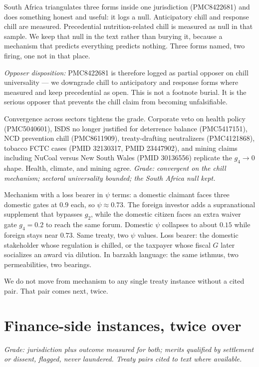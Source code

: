 South Africa triangulates three forms inside one jurisdiction (PMC8422681) and does something honest and useful: it logs a null. Anticipatory chill and response chill are measured. Precedential nutrition-related chill is measured as null in that sample. We keep that null in the text rather than burying it, because a mechanism that predicts everything predicts nothing. Three forms named, two firing, one not in that place.

\textit{Opposer disposition:} PMC8422681 is therefore logged as partial opposer on chill universality --- we downgrade chill to anticipatory and response forms where measured and keep precedential as open. This is not a footnote burial. It is the serious opposer that prevents the chill claim from becoming unfalsifiable.

Convergence across sectors tightens the grade. Corporate veto on health policy (PMC5040601), ISDS no longer justified for deterrence balance (PMC5417151), NCD prevention chill (PMC8611909), treaty-drafting neutralizers (PMC4121868), tobacco FCTC cases (PMID 32130317, PMID 23447902), and mining claims including NuCoal versus New South Wales (PMID 30136556) replicate the $g_4 \to 0$ shape. Health, climate, and mining agree. \textit{Grade: convergent on the chill mechanism; sectoral universality bounded; the South Africa null kept.}

Mechanism with a loss bearer in $\psi$ terms: a domestic claimant faces three domestic gates at $0.9$ each, so $\psi \approx 0.73$. The foreign investor adds a supranational supplement that bypasses $g_2$, while the domestic citizen faces an extra waiver gate $g_4 = 0.2$ to reach the same forum. Domestic $\psi$ collapses to about $0.15$ while foreign stays near $0.73$. Same treaty, two $\psi$ values. Loss bearer: the domestic stakeholder whose regulation is chilled, or the taxpayer whose fiscal $G$ later socializes an award via dilution. In barzakh language: the same isthmus, two permeabilities, two bearings.

We do not move from mechanism to any single treaty instance without a cited pair. That pair comes next, twice.

\section{Finance-side instances, twice over}

\textit{Grade: jurisdiction plus outcome measured for both; merits qualified by settlement or dissent, flagged, never laundered. Treaty pairs cited to text where available.}

